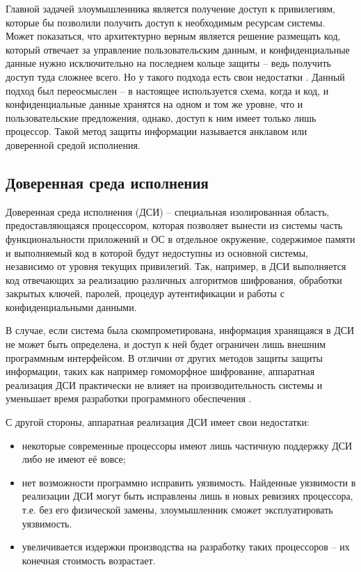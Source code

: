 Главной задачей злоумышленника является получение доступ к привилегиям, которые бы позволили получить доступ к необходимым ресурсам системы. Может показаться, что архитектурно верным является решение размещать код, который отвечает за управление пользовательским данным, и конфиденциальные данные нужно исключительно на последнем кольце защиты -- ведь получить доступ туда сложнее всего. Но у такого подхода есть свои недостатки \cite{complex-systems}. Данный подход был переосмыслен -- в настоящее используется схема, когда и код, и конфиденциальные данные хранятся на одном и том же уровне, что и пользовательские предложения, однако, доступ к ним имеет только лишь процессор. Такой метод защиты информации называется анклавом или доверенной средой исполнения.

\subsection{Доверенная среда исполнения}

Доверенная среда исполнения (ДСИ) -- специальная изолированная область, предоставляющаяся процессором, которая позволяет вынести из системы часть функциональности приложений и ОС в отдельное окружение, содержимое памяти и выполняемый код в которой будут недоступны из основной системы, независимо от уровня текущих привилегий. Так, например, в ДСИ выполняется код отвечающих за реализацию различных алгоритмов шифрования, обработки закрытых ключей, паролей, процедур аутентификации и работы с конфиденциальными данными. 

В случае, если система была скомпрометирована, информация хранящаяся в ДСИ не может быть определена, и доступ к ней будет ограничен лишь внешним программным интерфейсом. В отличии от других методов защиты защиты информации, таких как например гомоморфное шифрование, аппаратная реализация ДСИ практически не влияет на производительность системы и уменьшает время разработки программного обеспечения \cite{tee}.

С другой стороны, аппаратная реализация ДСИ имеет свои недостатки:

\begin{itemize}
	\item некоторые современные процессоры имеют лишь частичную поддержку ДСИ либо не имеют её вовсе;
	\item нет возможности программно исправить уязвимость. Найденные уязвимости в реализации ДСИ могут быть исправлены лишь в новых ревизиях процессора, т.е. без его физической замены, злоумышленник сможет эксплуатировать уязвимость.
	\item увеличивается издержки производства на разработку таких процессоров -- их конечная стоимость возрастает.
\end{itemize}

